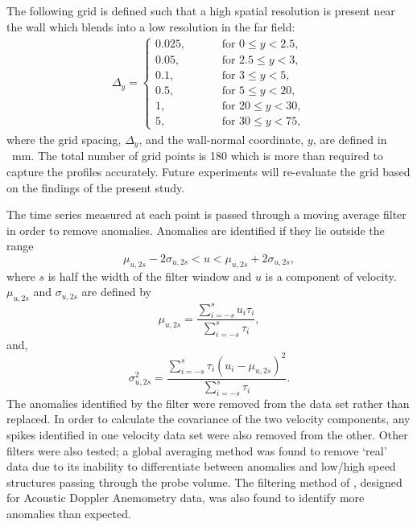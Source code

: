 \documentclass[12pt,oneside,a4paper]{article}
\begin{document}
 The following grid is defined such that a high spatial resolution is present near the wall which blends into a low resolution in the far field:
\begin{align*}
\Delta_y = 
\begin{cases}
0.025, \hspace{1cm} &\text{for } 0 \leqslant y < 2.5,\\
0.05, \hspace{1cm} &\text{for } 2.5 \leqslant y < 3,\\
0.1, \hspace{1cm} &\text{for } 3 \leqslant y < 5,\\
0.5, \hspace{1cm} &\text{for } 5 \leqslant y < 20,\\
1, \hspace{1cm} &\text{for } 20 \leqslant y < 30,\\
5, \hspace{1cm} &\text{for } 30 \leqslant y < 75,
\end{cases}
\end{align*}
where the grid spacing, $\Delta_y$, and the wall-normal coordinate, $y$, are defined in \SI{}{mm}. The total number of grid points is 180 which is more than required to capture the profiles accurately. Future experiments will re-evaluate the grid based on the findings of the present study.

The time series measured at each point is passed through a moving average filter in order to remove anomalies. Anomalies are identified if they lie outside the range
\begin{equation}
\mu_{u,2s} - 2 \sigma_{u,2s} < u < \mu_{u,2s} + 2 \sigma_{u,2s},
\end{equation}
where $s$ is half the width of the filter window and $u$ is a component of velocity. $\mu_{u,2s}$ and $\sigma_{u,2s}$ are defined by 
\begin{equation}
\mu_{u,2s} = \frac{\sum^s_{i=-s} u_i \tau_i}{\sum^s_{i=-s} \tau_i}, 
\end{equation}
and,
\begin{equation}
\sigma_{u,2s}^2 = \frac{\sum^s_{i=-s} \tau_i (u_i - \mu_{u,2s})^2}{\sum^s_{i=-s} \tau_i}.
\end{equation}
The anomalies identified by the filter were removed from the data set rather than replaced. In order to calculate the covariance of the two velocity components, any spikes identified in one velocity data set were also removed from the other. Other filters were also tested; a global averaging method was found to remove `real' data due to its inability to differentiate between anomalies and low/high speed structures passing through the probe volume. The filtering method of \cite{goring2002}, designed for Acoustic Doppler Anemometry data, was also found to identify more anomalies than expected. 
\end{document}
